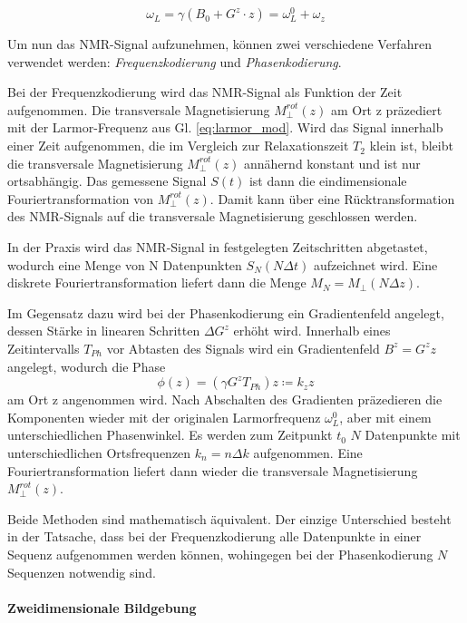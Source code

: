\documentclass[a4paper]{scrartcl} %
\begin{document}
\begin{equation}
	\omega_L = \gamma (B_0 + G^z \cdot z) = \omega_L^0 + \omega_z
	\label{eq:larmor_mod}
\end{equation}

Um nun das NMR-Signal aufzunehmen, können zwei verschiedene Verfahren verwendet werden: \textit{Frequenzkodierung} und \textit{Phasenkodierung}.

Bei der Frequenzkodierung wird das NMR-Signal als Funktion der Zeit aufgenommen. Die transversale Magnetisierung $M_{\perp}^{rot}(z)$ am Ort z präzediert mit der Larmor-Frequenz aus Gl. \eqref{eq:larmor_mod}. Wird das Signal innerhalb einer Zeit aufgenommen, die im Vergleich zur Relaxationszeit $T_2$ klein ist, bleibt die transversale Magnetisierung $M_{\perp}^{rot}(z)$ annähernd konstant und ist nur ortsabhängig. Das gemessene Signal $S(t)$ ist dann die eindimensionale Fouriertransformation von $M_{\perp}^{rot}(z)$. Damit kann über eine Rücktransformation des NMR-Signals auf die transversale Magnetisierung geschlossen werden.

In der Praxis wird das NMR-Signal in festgelegten Zeitschritten abgetastet, wodurch eine Menge von N Datenpunkten ${S_N(N \Delta t)}$ aufzeichnet wird. Eine diskrete Fouriertransformation liefert dann die Menge $M_N=M_{\perp}(N \Delta z)$.

Im Gegensatz dazu wird bei der Phasenkodierung ein Gradientenfeld angelegt, dessen Stärke in linearen Schritten $\Delta G^z$ erhöht wird. Innerhalb eines Zeitintervalls $T_{Ph}$ vor Abtasten des Signals wird ein Gradientenfeld $B^z = G^z z$ angelegt, wodurch die Phase
\begin{equation}
	\phi (z) = (\gamma G^z T_{Ph})z \coloneqq k_z z
\end{equation}
am Ort z angenommen wird. Nach Abschalten des Gradienten präzedieren die Komponenten wieder mit der originalen Larmorfrequenz $\omega_{L}^0$, aber mit einem unterschiedlichen Phasenwinkel. Es werden zum Zeitpunkt $t_0$ $N$ Datenpunkte mit unterschiedlichen Ortsfrequenzen $k_n=n\Delta k$ aufgenommen. Eine Fouriertransformation liefert dann wieder die transversale Magnetisierung $M_{\perp}^{rot}(z)$.

Beide Methoden sind mathematisch äquivalent. Der einzige Unterschied besteht in der Tatsache, dass bei der Frequenzkodierung alle Datenpunkte in einer Sequenz aufgenommen werden können, wohingegen bei der Phasenkodierung $N$ Sequenzen notwendig sind.

\paragraph{Zweidimensionale Bildgebung}
\end{document}
